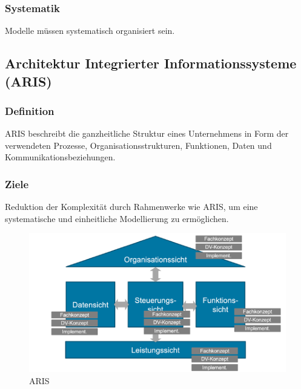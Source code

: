     \subsubsection*{Systematik}
        Modelle müssen systematisch organisiert sein.

\subsection{Architektur Integrierter Informationssysteme (ARIS)}
    \subsubsection*{Definition}
        ARIS beschreibt die ganzheitliche Struktur eines Unternehmens in Form der verwendeten Prozesse, Organisationsstrukturen, Funktionen, Daten und Kommunikationsbeziehungen.
    \subsubsection*{Ziele}
        Reduktion der Komplexität durch Rahmenwerke wie ARIS, um eine systematische und einheitliche Modellierung zu ermöglichen.
    \begin{figure}[h]
        \centering
        \includegraphics[width=\textwidth]{image/ARIS.png}
        \caption{ARIS}
        \label{fig:ARIS}
    \end{figure}